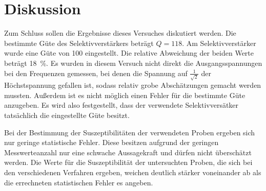 
\section{Diskussion}
%
Zum Schluss sollen die Ergebnisse dieses Versuches diskutiert werden.
Die bestimmte Güte des Selektivverstärkers beträgt $Q=\num{118}$.  Am
Selektivverstärker wurde eine Güte von 100 eingestellt.  Die relative
Abweichung der beiden Werte beträgt \SI{18}{\percent}.  Es wurden in
diesem Versuch nicht direkt die Ausgangsspannungen bei den Frequenzen
gemessen, bei denen die Spannung auf $\frac{1}{\sqrt{2}}$ der
Höchstspannung gefallen ist, sodass relativ grobe Abschätzungen gemacht
werden mussten.  Außerdem ist es nicht möglich einen Fehler für die
bestimmte Güte anzugeben.  Es wird also festgestellt, dass der
verwendete Selektivversätker tatsächlich die eingestellte Güte besitzt.

Bei der Bestimmung der Suszeptibilitäten der verwendeten Proben ergeben
sich nur geringe statistische Fehler.  Diese besitzen aufgrund der
geringen Messwerteanzahl nur eine schwache Aussagekraft und dürfen nicht
überschätzt werden. Die Werte für die Suszeptibilität der untersuchten
Proben, die sich bei den verschiedenen Verfahren ergeben, weichen
deutlich stärker voneinander ab als die errechneten statistischen Fehler
es angeben.
%
